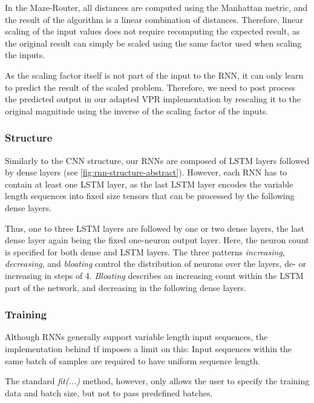 In the Maze-Router, all distances are computed using the Manhattan metric, and the result of the algorithm is a linear combination of distances. Therefore, linear scaling of the input values does not require recomputing the expected result, as the original result can simply be scaled using the same factor used when scaling the inputs.

As the scaling factor itself is not part of the input to the \gls{RNN}, it can only learn to predict the result of the scaled problem. Therefore, we need to post process the predicted output in our adapted \gls{VPR} implementation by rescaling it to the original magnitude using the inverse of the scaling factor of the inputs.

\subsubsection{Structure}\label{ch:rnn-design}

Similarly to the \gls{CNN} structure, our \glspl{RNN} are composed of \gls{LSTM} layers followed by dense layers (see \ref{fig:rnn-structure-abstract}). However, each \gls{RNN} has to contain at least one \gls{LSTM} layer, as the last \gls{LSTM} layer encodes the variable length sequences into fixed size tensors that can be processed by the following dense layers.

Thus, one to three \gls{LSTM} layers are followed by one or two dense layers, the last dense layer again being the fixed one-neuron output layer. Here, the neuron count is specified for both dense and \gls{LSTM} layers. The three patterns \textit{increasing}, \textit{decreasing}, and \textit{bloating} control the distribution of neurons over the layers, de- or increasing in steps of 4. \textit{Bloating} describes an increasing count within the \gls{LSTM} part of the network, and decreasing in the following dense layers.

\subsubsection{Training}

Although \glspl{RNN} generally support variable length input sequences, the implementation behind \gls{tf} imposes a limit on this: Input sequences within the same batch of samples are required to have uniform sequence length.

The standard \textit{fit(...)} method, however, only allows the user to specify the training data and batch size, but not to pass predefined batches.

